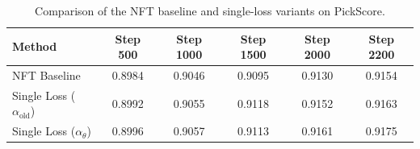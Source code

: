 \documentclass{article} %
\begin{document}
\begin{table}[H]
\centering
\small
\setlength{\tabcolsep}{6pt}
\renewcommand{\arraystretch}{1.1}
\caption{
Comparison of the NFT baseline and single-loss variants on GenEval at different training steps.
The repeated runs are included to evaluate the stability of the single-loss formulations.
The repeated $\alpha_{\theta}$ run terminates at Step 470 with a GenEval score of 0.9511 because of OOM.
}

\label{tab:single_loss_geneval}
\end{table}


\begin{table}[H]
\centering
\small
\setlength{\tabcolsep}{6pt}
\renewcommand{\arraystretch}{1.1}
\caption{
Comparison of the NFT baseline and single-loss variants on PickScore.
}
\begin{tabular}{l c c c c c}
\hline\hline
Method 
& Step 500 & Step 1000 & Step 1500 & Step 2000 & Step 2200 \\
\hline

NFT Baseline
& 0.8984 & 0.9046 & 0.9095 & 0.9130 & 0.9154 \\

Single Loss ($\alpha_{\text{old}}$)
& 0.8992 & 0.9055 & 0.9118 & 0.9152 & 0.9163 \\

Single Loss ($\alpha_{\theta}$)
& 0.8996 & 0.9057 & 0.9113 & 0.9161 & 0.9175 \\

\hline\hline
\end{tabular}
\label{tab:single_loss_pickscore}
\end{table}
\end{document}
